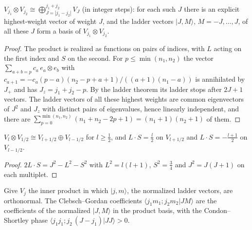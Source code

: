 \begin{theorem}\label{thm:cg-series}
  \leanok
  $V_{j_1}\otimes V_{j_2}\cong\bigoplus_{J=|j_1-j_2|}^{j_1+j_2}V_J$ (in integer steps): for each such $J$ there is an explicit
  highest-weight vector of weight $J$, and the ladder vectors $|J,M\rangle$, $M=-J,\dots,J$, of all these $J$ form a basis of
  $V_{j_1}\otimes V_{j_2}$.
\end{theorem}
\begin{proof}\leanok
  The product is realized as functions on pairs of indices, with $L$ acting on the first index and $S$ on the second. For
  $p\le\min(n_1,n_2)$ the vector $\sum_{a+b=p}c_a\,e_a\otimes e_b$ with $c_{a+1}=-c_a(p-a)(n_2-p+a+1)/((a+1)(n_1-a))$ is
  annihilated by $J_+$ and has $J_z=j_1+j_2-p$. By the ladder theorem its ladder stops after $2J+1$ vectors. The ladder
  vectors of all these highest weights are common eigenvectors of $J^2$ and $J_z$ with distinct pairs of eigenvalues, hence
  linearly independent, and there are $\sum_{p=0}^{\min(n_1,n_2)}(n_1+n_2-2p+1)=(n_1+1)(n_2+1)$ of them.
\end{proof}

\begin{corollary}\label{cor:spin-orbit}
  \leanok
  $V_l\otimes V_{1/2}\cong V_{l+1/2}\oplus V_{l-1/2}$ for $l\ge\tfrac12$, and $L\cdot S=\tfrac l2$ on $V_{l+1/2}$ and
  $L\cdot S=-\tfrac{l+1}2$ on $V_{l-1/2}$.
\end{corollary}
\begin{proof}\leanok
  $2L\cdot S=J^2-L^2-S^2$ with $L^2=l(l+1)$, $S^2=\tfrac34$ and $J^2=J(J+1)$ on each multiplet.
\end{proof}

\begin{definition}\label{def:cg-coeff}
  \leanok
  Give $V_j$ the inner product in which $|j,m\rangle$, the normalized ladder vectors, are orthonormal. The Clebsch--Gordan
  coefficients $\langle j_1m_1;j_2m_2|JM\rangle$ are the coefficients of the normalized $|J,M\rangle$ in the product basis, with the
  Condon--Shortley phase $\langle j_1j_1;j_2\,(J-j_1)|JJ\rangle>0$.
\end{definition}

